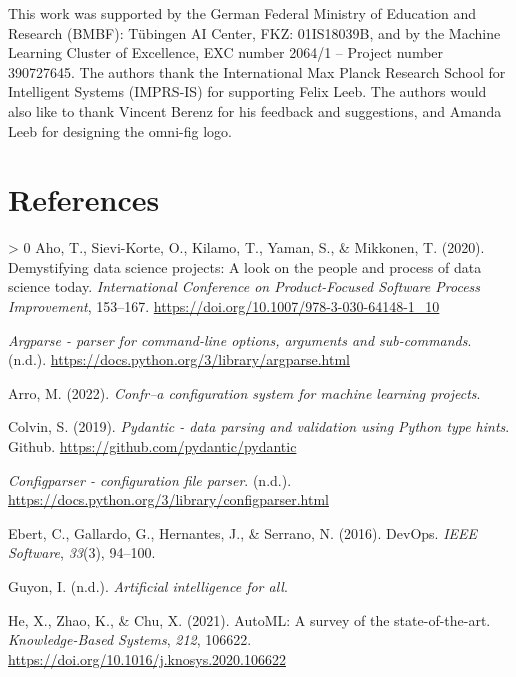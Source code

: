 \documentclass[10pt,a4paper,onecolumn]{article}
\let\textttOrig=\texttt
\def\texttt#1{\expandafter\textttOrig{\seqsplit{#1}}}
\newlength{\cslhangindent}
\newenvironment{CSLReferences}[3] %
 {%
  \setlength{\parindent}{0pt}
  \ifodd #1 \everypar{\setlength{\hangindent}{\cslhangindent}}\ignorespaces\fi
  \ifnum #2 > 0
  \setlength{\parskip}{#2\baselineskip}
  \fi
 }%
 {}
\let\addcontentslineOrig=\addcontentsline
\def\addcontentsline#1#2#3{\bgroup
  \let\texttt=\textttOrig\addcontentslineOrig{#1}{#2}{#3}\egroup}
\begin{document}
This work was supported by the German Federal Ministry of Education and
Research (BMBF): Tübingen AI Center, FKZ: 01IS18039B, and by the Machine
Learning Cluster of Excellence, EXC number 2064/1 -- Project number
390727645. The authors thank the International Max Planck Research
School for Intelligent Systems (IMPRS-IS) for supporting Felix Leeb. The
authors would also like to thank Vincent Berenz for his feedback and
suggestions, and Amanda Leeb for designing the omni-fig logo.

\hypertarget{references}{%
\section*{References}\label{references}}

\hypertarget{refs}{}
\begin{CSLReferences}{1}{0}
\leavevmode\hypertarget{ref-aho2020demystifying}{}%
Aho, T., Sievi-Korte, O., Kilamo, T., Yaman, S., \& Mikkonen, T. (2020).
Demystifying data science projects: A look on the people and process of
data science today. \emph{International Conference on Product-Focused
Software Process Improvement}, 153--167.
\url{https://doi.org/10.1007/978-3-030-64148-1_10}

\leavevmode\hypertarget{ref-argparse}{}%
\emph{Argparse - parser for command-line options, arguments and
sub-commands}. (n.d.).
\url{https://docs.python.org/3/library/argparse.html}

\leavevmode\hypertarget{ref-arro2022confr}{}%
Arro, M. (2022). \emph{Confr--a configuration system for machine
learning projects}.

\leavevmode\hypertarget{ref-pydantic}{}%
Colvin, S. (2019). \emph{Pydantic - data parsing and validation using
{P}ython type hints}. Github. \url{https://github.com/pydantic/pydantic}

\leavevmode\hypertarget{ref-configparser}{}%
\emph{Configparser - configuration file parser}. (n.d.).
\url{https://docs.python.org/3/library/configparser.html}

\leavevmode\hypertarget{ref-ebert2016devops}{}%
Ebert, C., Gallardo, G., Hernantes, J., \& Serrano, N. (2016). DevOps.
\emph{IEEE Software}, \emph{33}(3), 94--100.

\leavevmode\hypertarget{ref-guyonartificial}{}%
Guyon, I. (n.d.). \emph{Artificial intelligence for all}.

\leavevmode\hypertarget{ref-he2021automl}{}%
He, X., Zhao, K., \& Chu, X. (2021). AutoML: A survey of the
state-of-the-art. \emph{Knowledge-Based Systems}, \emph{212}, 106622.
\url{https://doi.org/10.1016/j.knosys.2020.106622}


\end{CSLReferences}
\end{document}
